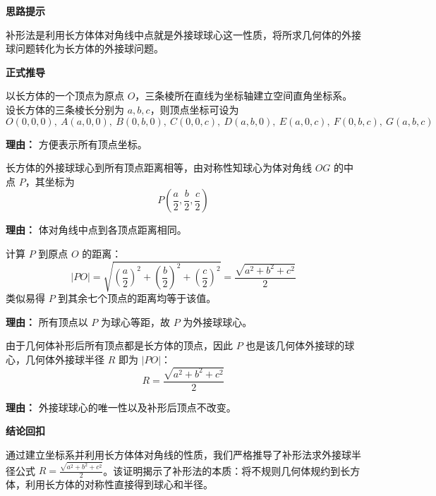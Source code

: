\begin{proofbox}
	\textbf{\textcolor{CProof}{思路提示}}

	补形法是利用长方体体对角线中点就是外接球球心这一性质，将所求几何体的外接球问题转化为长方体的外接球问题。

	\medskip
	\textbf{\textcolor{CProof}{正式推导}}
	\begin{description}[style=nextline, leftmargin=2.8em, labelsep=0.5em, itemsep=0.55em]
		\item[\textbf{步骤一（建系设点）：}] 以长方体的一个顶点为原点 $O$，三条棱所在直线为坐标轴建立空间直角坐标系。设长方体的三条棱长分别为 $a,b,c$，则顶点坐标可设为
			\[
				O(0,0,0),\ A(a,0,0),\ B(0,b,0),\ C(0,0,c),\ D(a,b,0),\ E(a,0,c),\ F(0,b,c),\ G(a,b,c)
			\]
			\par\textbf{理由：} 方便表示所有顶点坐标。

		\item[\textbf{步骤二（球心坐标）：}] 长方体的外接球球心到所有顶点距离相等，由对称性知球心为体对角线 $OG$ 的中点 $P$，其坐标为
			\[
				P\left(\frac{a}{2},\frac{b}{2},\frac{c}{2}\right)
			\]
			\par\textbf{理由：} 体对角线中点到各顶点距离相同。

		\item[\textbf{步骤三（距离验证）：}] 计算 $P$ 到原点 $O$ 的距离：
			\[
				|PO| = \sqrt{\left(\frac{a}{2}\right)^2 + \left(\frac{b}{2}\right)^2 + \left(\frac{c}{2}\right)^2} = \frac{\sqrt{a^{2}+b^{2}+c^{2}}}{2}
			\]
			类似易得 $P$ 到其余七个顶点的距离均等于该值。
			\par\textbf{理由：} 所有顶点以 $P$ 为球心等距，故 $P$ 为外接球球心。

		\item[\textbf{步骤四（回代结论）：}] 由于几何体补形后所有顶点都是长方体的顶点，因此 $P$ 也是该几何体外接球的球心，几何体外接球半径 $R$ 即为 $|PO|$：
			\[
				R = \frac{\sqrt{a^{2}+b^{2}+c^{2}}}{2}
			\]
			\par\textbf{理由：} 外接球球心的唯一性以及补形后顶点不改变。
	\end{description}

	\medskip
	\textbf{\textcolor{CProof}{结论回扣}}

	通过建立坐标系并利用长方体体对角线的性质，我们严格推导了补形法求外接球半径公式 $R = \frac{\sqrt{a^{2}+b^{2}+c^{2}}}{2}$。该证明揭示了补形法的本质：将不规则几何体规约到长方体，利用长方体的对称性直接得到球心和半径。
\end{proofbox}
